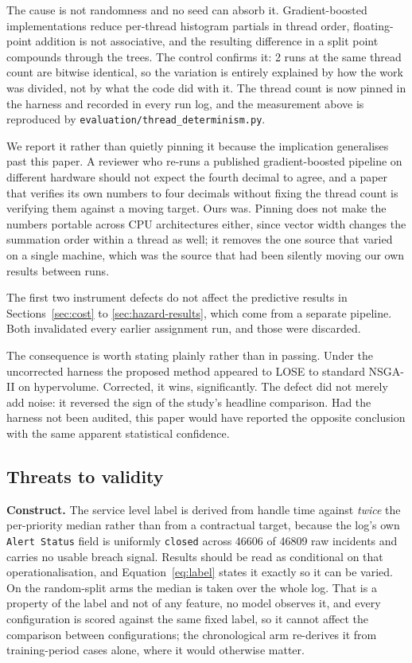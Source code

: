 The cause is not randomness and no seed can absorb it. Gradient-boosted implementations
reduce per-thread histogram partials in thread order, floating-point addition is not
associative, and the resulting difference in a split point compounds through the trees. The
control confirms it: \num{2} runs at the same thread count are bitwise identical,
so the variation is entirely explained by how the work was divided, not by what the code did
with it. The thread count is now pinned in the harness and recorded in every run log, and the
measurement above is reproduced by \texttt{evaluation/thread\_determinism.py}.

We report it rather than quietly pinning it because the implication generalises past this
paper. A reviewer who re-runs a published gradient-boosted pipeline on different hardware
should not expect the fourth decimal to agree, and a paper that verifies its own numbers to
four decimals without fixing the thread count is verifying them against a moving target. Ours
was. Pinning does not make the numbers portable across CPU architectures either, since vector
width changes the summation order within a thread as well; it removes the one source that
varied on a single machine, which was the source that had been silently moving our own
results between runs.

The first two instrument defects do not affect the predictive results in
Sections~\ref{sec:cost} to \ref{sec:hazard-results}, which come from a separate pipeline. Both
invalidated every earlier assignment run, and those were discarded.

The consequence is worth stating plainly rather than in passing. Under the uncorrected
harness the proposed method appeared to LOSE to standard NSGA-II on hypervolume. Corrected,
it wins, significantly. The defect did not merely add noise: it reversed the sign of the
study's headline comparison. Had the harness not been audited, this paper would have
reported the opposite conclusion with the same apparent statistical confidence.

\subsection{Threats to validity}

\textbf{Construct.} The service level label is derived from handle time against \emph{twice} the
per-priority median rather than from a contractual target, because the log's own
\texttt{Alert Status} field is uniformly \texttt{closed} across \num{46606} of \num{46809} raw
incidents and carries no usable breach signal. Results should be read as conditional on that
operationalisation, and Equation~\ref{eq:label} states it exactly so it can be varied. On the
random-split arms the median is taken over the whole log. That is a property of the label and
not of any feature, no model observes it, and every configuration is scored against the same
fixed label, so it cannot affect the comparison between configurations; the chronological arm
re-derives it from training-period cases alone, where it would otherwise matter.

